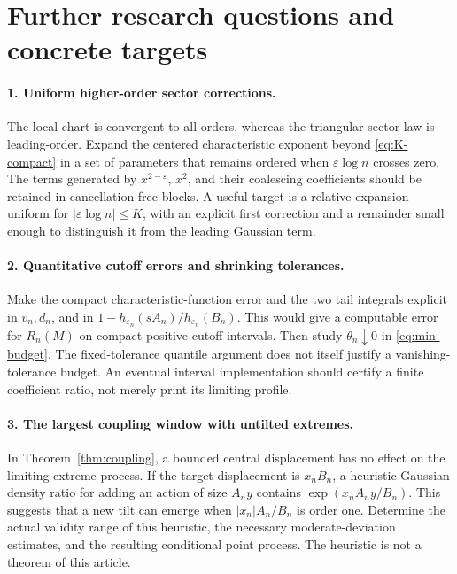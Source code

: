 \documentclass[11pt,a4paper]{article}
\numberwithin{equation}{section}
\theoremstyle{definition}
\theoremstyle{remark}
\newcommand{\eps}{\varepsilon}
\begin{document}
\section{Further research questions and concrete targets}
\label{sec:future}

\paragraph{1. Uniform higher-order sector corrections.}
The local chart is convergent to all orders, whereas the triangular sector
law is leading-order. Expand the centered characteristic exponent beyond
\eqref{eq:K-compact} in a set of parameters that remains ordered when
\(\eps\log n\) crosses zero. The terms generated by
\(x^{2-\eps}\), \(x^2\), and their coalescing coefficients should be retained
in cancellation-free blocks. A useful target is a relative expansion uniform
for \(|\eps\log n|\le K\), with an explicit first correction and a remainder
small enough to distinguish it from the leading Gaussian term.

\paragraph{2. Quantitative cutoff errors and shrinking tolerances.}
Make the compact characteristic-function error and the two tail integrals
explicit in \(v_n,d_n\), and in
\(1-h_{\eps_n}(sA_n)/h_{\eps_n}(B_n)\). This would give a computable error
for \(R_n(M)\) on compact positive cutoff intervals. Then study
\(\theta_n\downarrow0\) in \eqref{eq:min-budget}. The fixed-tolerance
quantile argument does not itself justify a vanishing-tolerance budget.
An eventual interval implementation should certify a finite coefficient
ratio, not merely print its limiting profile.

\paragraph{3. The largest coupling window with untilted extremes.}
In Theorem~\ref{thm:coupling}, a bounded central displacement has no effect on
the limiting extreme process. If the target displacement is \(x_nB_n\),
a heuristic Gaussian density ratio for adding an action of size \(A_ny\)
contains \(\exp(x_nA_ny/B_n)\). This suggests that a new tilt can emerge
when \(|x_n|A_n/B_n\) is order one. Determine the actual validity range of
this heuristic, the necessary moderate-deviation estimates, and the resulting
conditional point process. The heuristic is not a theorem of this article.
\end{document}
